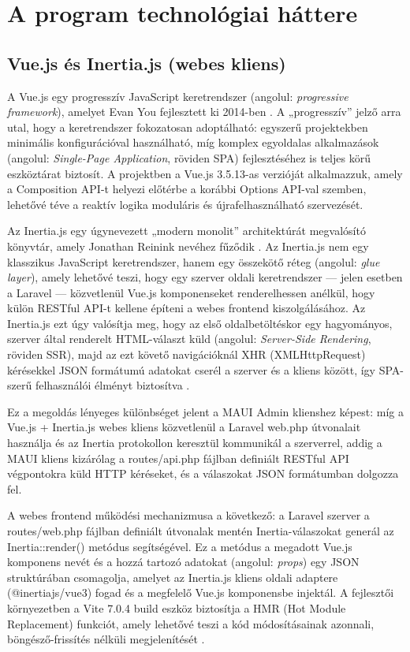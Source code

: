 \documentclass[colorlinks]{thesis-kando}
\begin{document}
\chapter{A program technológiai háttere}

\section{Vue.js és Inertia.js (webes kliens)}

A Vue.js egy progresszív JavaScript keretrendszer (angolul: \emph{progressive framework}), amelyet Evan You fejlesztett ki 2014-ben \cite{ref4}. A „progresszív'' jelző arra utal, hogy a keretrendszer fokozatosan adoptálható: egyszerű projektekben minimális konfigurációval használható, míg komplex egyoldalas alkalmazások (angolul: \emph{Single-Page Application}, röviden SPA) fejlesztéséhez is teljes körű eszköztárat biztosít. A projektben a Vue.js 3.5.13-as verzióját alkalmazzuk, amely a Composition API-t helyezi előtérbe a korábbi Options API-val szemben, lehetővé téve a reaktív logika moduláris és újrafelhasználható szervezését.

Az Inertia.js egy úgynevezett „modern monolit'' architektúrát megvalósító könyvtár, amely Jonathan Reinink nevéhez fűződik \cite{ref5}. Az Inertia.js nem egy klasszikus JavaScript keretrendszer, hanem egy összekötő réteg (angolul: \emph{glue layer}), amely lehetővé teszi, hogy egy szerver oldali keretrendszer --- jelen esetben a Laravel --- közvetlenül Vue.js komponenseket renderelhessen anélkül, hogy külön RESTful API-t kellene építeni a webes frontend kiszolgálásához. Az Inertia.js ezt úgy valósítja meg, hogy az első oldalbetöltéskor egy hagyományos, szerver által renderelt HTML-választ küld (angolul: \emph{Server-Side Rendering}, röviden SSR), majd az ezt követő navigációknál XHR (XMLHttpRequest) kérésekkel JSON formátumú adatokat cserél a szerver és a kliens között, így SPA-szerű felhasználói élményt biztosítva \cite{ref5}.

Ez a megoldás lényeges különbséget jelent a MAUI Admin klienshez képest: míg a Vue.js + Inertia.js webes kliens közvetlenül a Laravel web.php útvonalait használja és az Inertia protokollon keresztül kommunikál a szerverrel, addig a MAUI kliens kizárólag a routes/api.php fájlban definiált RESTful API végpontokra küld HTTP kéréseket, és a válaszokat JSON formátumban dolgozza fel.

A webes frontend működési mechanizmusa a következő: a Laravel szerver a routes/web.php fájlban definiált útvonalak mentén Inertia-válaszokat generál az Inertia::render() metódus segítségével. Ez a metódus a megadott Vue.js komponens nevét és a hozzá tartozó adatokat (angolul: \emph{props}) egy JSON struktúrában csomagolja, amelyet az Inertia.js kliens oldali adaptere (@inertiajs/vue3) fogad és a megfelelő Vue.js komponensbe injektál. A fejlesztői környezetben a Vite 7.0.4 build eszköz biztosítja a HMR (Hot Module Replacement) funkciót, amely lehetővé teszi a kód módosításainak azonnali, böngésző-frissítés nélküli megjelenítését \cite{ref6}.
\end{document}
